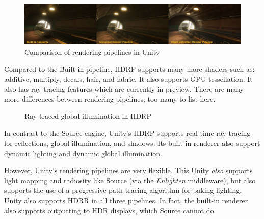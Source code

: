 \documentclass[a4paper, 12pt]{scrartcl}
\begin{document}
\begin{figure}[!ht]
  \centering
  \includegraphics[width=\linewidth]{images/unity_pipelines.png}
  \caption{Comparison of rendering pipelines in Unity}
  \label{fig:unity_pipelines}
\end{figure}

Compared to the Built-in pipeline, HDRP supports many more shaders such as: additive, multiply, decals, hair, and fabric. It also supports GPU tessellation. It also has ray tracing features which are currently in preview. There are many more differences between rendering pipelines; too many to list here.

\begin{figure}[!ht]
  \centering
  \qquad
  \caption{Ray-traced global illumination in HDRP}
  \label{fig:unity_rt_gi}
\end{figure}

In contrast to the Source engine, Unity's HDRP supports real-time ray tracing for reflections, global illumination, and shadows. Its built-in renderer also support dynamic lighting and dynamic global illumination.

However, Unity's rendering pipelines are very flexible. This Unity \textit {also} supports light mapping and radiosity like Source (via the \textit{Enlighten} middleware), but also supports the use of a progressive path tracing algorithm for baking lighting. Unity also supports HDRR in all three pipelines. In fact, the built-in renderer also supports outputting to HDR displays, which Source cannot do.
\end{document}
